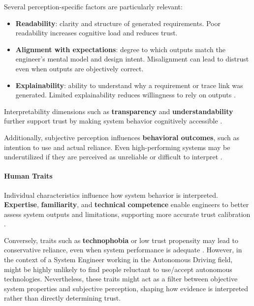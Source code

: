\documentclass[sigconf]{acmart}
\begin{document}
Several perception-specific factors are particularly relevant:

\begin{itemize}[leftmargin=*, label=\textbullet]
    \item \textbf{Readability}: clarity and structure of generated requirements. Poor readability increases cognitive load and reduces trust.
    
    \item \textbf{Alignment with expectations}: degree to which outputs match the engineer’s mental model and design intent. Misalignment can lead to distrust even when outputs are objectively correct.
    
    \item \textbf{Explainability}: ability to understand why a requirement or trace link was generated. Limited explainability reduces willingness to rely on outputs \cite{glickson_2020_review_of_empirical_research}.
\end{itemize}

Interpretability dimensions such as \textbf{transparency} and \textbf{understandability} further support trust by making system behavior cognitively accessible \cite{naiseh_2023_class, schepman_general_attitude}. 

Additionally, subjective perception influences \textbf{behavioral outcomes}, such as intention to use and actual reliance. Even high-performing systems may be underutilized if they are perceived as unreliable or difficult to interpret \cite{choudhury_chat_gpt}.

\paragraph{Human Traits}

Individual characteristics influence how system behavior is interpreted. \textbf{Expertise}, \textbf{familiarity}, and \textbf{technical competence} enable engineers to better assess system outputs and limitations, supporting more accurate trust calibration \cite{zhang_et_al_2023, Wang_yin_2021, Aldoseri_et_al_2023}.

Conversely, traits such as \textbf{technophobia} or low trust propensity may lead to conservative reliance, even when system performance is adequate \cite{What_factors_contribute_to_the_acceptance_of_artificial_intelligence, Rheuetal.2020.SystematicReviewTrustBuildingFactors}. However, in the context of a System Engineer working in the Autonomous Driving field, might be highly unlikely to find people reluctant to use/accept autonomous technologies. Nevertheless, these traits might act as a filter between objective system properties and subjective perception, shaping how evidence is interpreted rather than directly determining trust.
\end{document}
